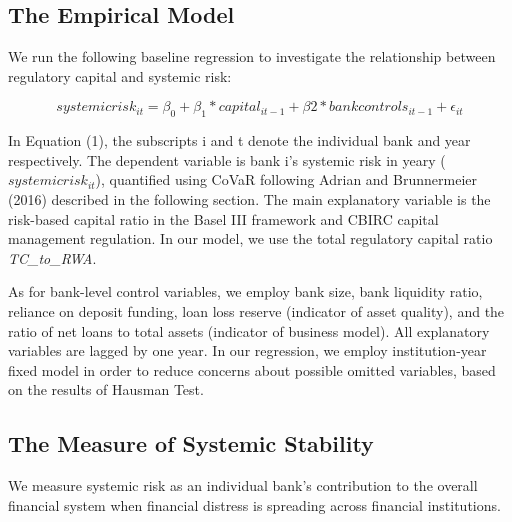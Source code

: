 \documentclass[
  12pt,
  a4paper,
]{scrreprt}
\begin{document}
{{{{\begin{table}
{}

\end{table}%

\subsection{The Empirical Model}\label{the-empirical-model}

We run the following baseline regression to investigate the relationship
between regulatory capital and systemic risk:

\begin{equation}
\tag{1}
systemic risk_{it} = \beta_{0} + \beta_{1}*capital_{it-1} + \beta{2}*bankcontrols_{it-1} + \epsilon_{it}
\end{equation}

In Equation (1), the subscripts i and t denote the individual bank and
year respectively. The dependent variable is bank i's systemic risk in
yeary (\(systemic risk_{it}\)), quantified using CoVaR following Adrian
and Brunnermeier (2016) described in the following section. The main
explanatory variable is the risk-based capital ratio in the Basel III
framework and CBIRC capital management regulation. In our model, we use
the total regulatory capital ratio \emph{TC\_to\_RWA}.

As for bank-level control variables, we employ bank size, bank liquidity
ratio, reliance on deposit funding, loan loss reserve (indicator of
asset quality), and the ratio of net loans to total assets (indicator of
business model). All explanatory variables are lagged by one year. In
our regression, we employ institution-year fixed model in order to
reduce concerns about possible omitted variables, based on the results
of Hausman Test.

\subsection{The Measure of Systemic
Stability}\label{the-measure-of-systemic-stability}

We measure systemic risk as an individual bank's contribution to the
overall financial system when financial distress is spreading across
financial institutions.

}}}}
\end{document}
